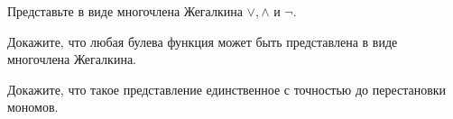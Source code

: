 \begin{enumcyr}
    \item Представьте в виде многочлена Жегалкина $\lor, \land$ и $\lnot$.
    \item Докажите, что любая булева функция может быть представлена в виде многочлена Жегалкина.
    \item Докажите, что такое представление единственное с точностью до перестановки мономов.
\end{enumcyr}
